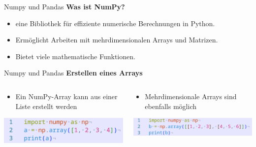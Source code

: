 \documentclass[aspectratio=169]{beamer}
\begin{document}
\begin{frame}{Numpy und Pandas}
\textbf{Was ist NumPy?}
    \begin{itemize}
        \item eine Bibliothek für effiziente numerische Berechnungen in Python.
        \item Ermöglicht Arbeiten mit mehrdimensionalen Arrays und Matrizen.
        \item Bietet viele mathematische Funktionen.
    \end{itemize}
\end{frame}

\begin{frame}{Numpy und Pandas}
    \textbf{Erstellen eines Arrays}
    \begin{columns}
        \begin{column}{0.5\textwidth}
            \begin{itemize}
                \item Ein NumPy-Array kann aus einer Liste erstellt werden
            \end{itemize}
            \begin{tcolorbox}[colframe=oxfordblue, colback=blue!10, coltitle=white, title=Python]
                \includegraphics[width=\textwidth]{images/code_numpylistcreation.png}
            \end{tcolorbox}
        \end{column}
        \pause
        \begin{column}{0.5\textwidth}
            \begin{itemize}
                \item Mehrdimensionale Arrays sind ebenfalls möglich
            \end{itemize}
            \begin{tcolorbox}[colframe=oxfordblue, colback=blue!10, coltitle=white, title=Python]
                \includegraphics[width=\textwidth]{images/code_numpylistmultidimgeneration.png}
            \end{tcolorbox}
        \end{column}
    \end{columns}
\end{frame}
\end{document}

